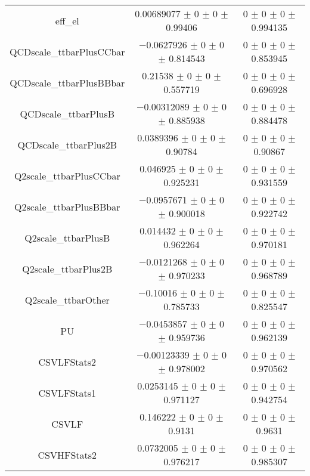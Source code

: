 \begin{table}
\begin{tabular}{ccc}
eff\_el & \num{0.00689077} $\pm$ \num{0} $\pm$ \num{0} $\pm$ \num{0.99406} & \num{0} $\pm$ \num{0} $\pm$ \num{0} $\pm$ \num{0.994135}\\
QCDscale\_ttbarPlusCCbar & \num{-0.0627926} $\pm$ \num{0} $\pm$ \num{0} $\pm$ \num{0.814543} & \num{0} $\pm$ \num{0} $\pm$ \num{0} $\pm$ \num{0.853945}\\
QCDscale\_ttbarPlusBBbar & \num{0.21538} $\pm$ \num{0} $\pm$ \num{0} $\pm$ \num{0.557719} & \num{0} $\pm$ \num{0} $\pm$ \num{0} $\pm$ \num{0.696928}\\
QCDscale\_ttbarPlusB & \num{-0.00312089} $\pm$ \num{0} $\pm$ \num{0} $\pm$ \num{0.885938} & \num{0} $\pm$ \num{0} $\pm$ \num{0} $\pm$ \num{0.884478}\\
QCDscale\_ttbarPlus2B & \num{0.0389396} $\pm$ \num{0} $\pm$ \num{0} $\pm$ \num{0.90784} & \num{0} $\pm$ \num{0} $\pm$ \num{0} $\pm$ \num{0.90867}\\
Q2scale\_ttbarPlusCCbar & \num{0.046925} $\pm$ \num{0} $\pm$ \num{0} $\pm$ \num{0.925231} & \num{0} $\pm$ \num{0} $\pm$ \num{0} $\pm$ \num{0.931559}\\
Q2scale\_ttbarPlusBBbar & \num{-0.0957671} $\pm$ \num{0} $\pm$ \num{0} $\pm$ \num{0.900018} & \num{0} $\pm$ \num{0} $\pm$ \num{0} $\pm$ \num{0.922742}\\
Q2scale\_ttbarPlusB & \num{0.014432} $\pm$ \num{0} $\pm$ \num{0} $\pm$ \num{0.962264} & \num{0} $\pm$ \num{0} $\pm$ \num{0} $\pm$ \num{0.970181}\\
Q2scale\_ttbarPlus2B & \num{-0.0121268} $\pm$ \num{0} $\pm$ \num{0} $\pm$ \num{0.970233} & \num{0} $\pm$ \num{0} $\pm$ \num{0} $\pm$ \num{0.968789}\\
Q2scale\_ttbarOther & \num{-0.10016} $\pm$ \num{0} $\pm$ \num{0} $\pm$ \num{0.785733} & \num{0} $\pm$ \num{0} $\pm$ \num{0} $\pm$ \num{0.825547}\\
PU & \num{-0.0453857} $\pm$ \num{0} $\pm$ \num{0} $\pm$ \num{0.959736} & \num{0} $\pm$ \num{0} $\pm$ \num{0} $\pm$ \num{0.962139}\\
CSVLFStats2 & \num{-0.00123339} $\pm$ \num{0} $\pm$ \num{0} $\pm$ \num{0.978002} & \num{0} $\pm$ \num{0} $\pm$ \num{0} $\pm$ \num{0.970562}\\
CSVLFStats1 & \num{0.0253145} $\pm$ \num{0} $\pm$ \num{0} $\pm$ \num{0.971127} & \num{0} $\pm$ \num{0} $\pm$ \num{0} $\pm$ \num{0.942754}\\
CSVLF & \num{0.146222} $\pm$ \num{0} $\pm$ \num{0} $\pm$ \num{0.9131} & \num{0} $\pm$ \num{0} $\pm$ \num{0} $\pm$ \num{0.9631}\\
CSVHFStats2 & \num{0.0732005} $\pm$ \num{0} $\pm$ \num{0} $\pm$ \num{0.976217} & \num{0} $\pm$ \num{0} $\pm$ \num{0} $\pm$ \num{0.985307}\\

\end{tabular}
\end{table}
